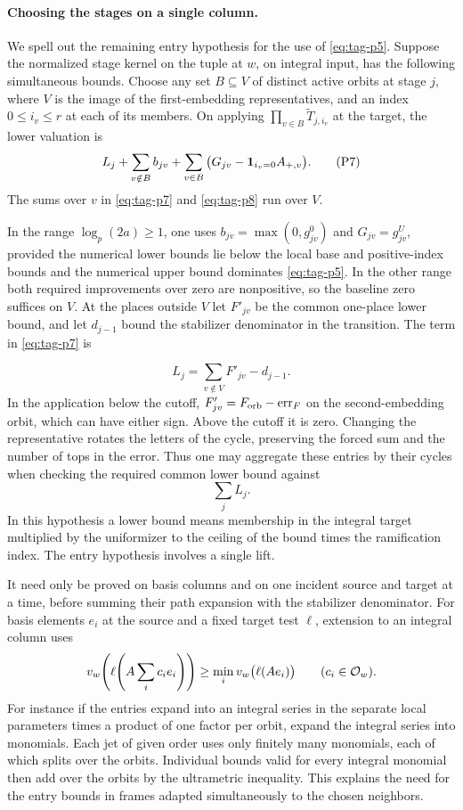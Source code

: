 \paragraph{Choosing the stages on a single column.}
We spell out the remaining entry hypothesis for the use of \eqref{eq:tag-p5}.
Suppose the normalized stage kernel on the tuple at \(w\), on
integral input, has the following simultaneous bounds. Choose any
set \(B\subseteq V\) of distinct active orbits at stage \(j\), where
\(V\) is the image of the first-embedding representatives, and an
index \(0\le i_v\le r\) at each of its members. On applying \(\prod_{v\in B}
\widetilde T_{j,i_v}\) at the target, the lower valuation is
\[
 L_j+\sum_{v\notin B} b_{jv}
    +\sum_{v\in B}\big(G_{jv}-{\bf1}_{i_v=0}A_{+,v}\big).
 \tag{P7}\label{eq:tag-p7}
\]
The sums over \(v\) in \eqref{eq:tag-p7} and \eqref{eq:tag-p8} run over \(V\).

In the
range \(\log_p(2a)\ge1\), one uses
\(b_{jv}=\max(0,g^0_{jv})\) and \(G_{jv}=g^U_{jv}\),
provided the numerical lower bounds lie below the local base
and positive-index bounds and the numerical upper bound dominates
\eqref{eq:tag-p5}. In the other range both required improvements over zero
are nonpositive, so the baseline zero suffices on \(V\).
At the places outside \(V\) let \(F'_{jv}\) be the common
one-place lower bound, and let \(d_{j-1}\) bound the
stabilizer denominator in the transition. The term in \eqref{eq:tag-p7} is

\[
  L_j=\sum_{v\notin V}F'_{jv}-d_{j-1}.
\]
In the application below the cutoff,
\(F'_{jv}=F_{\rm orb}-\mathrm{err}_F\) on the second-embedding
orbit, which can have either sign. Above the cutoff it is zero.
Changing the representative rotates the letters of the cycle,
preserving the forced sum and the number of tops in the error.
Thus one may aggregate these entries by their cycles when
checking the required common lower bound against 
\[
  \sum_j L_j.
\]
 In this hypothesis a lower
bound means membership in the integral target multiplied by the
uniformizer to the ceiling of the bound times the ramification
index. The entry hypothesis involves a single lift.

It need only
be proved on basis columns and on one incident source and target
at a time, before summing their path expansion with the
stabilizer denominator.
For basis elements \(e_i\) at the source and a fixed target test \(\ell\), extension to an integral column uses
\[
  v_w\!\left(\ell\!\left(A\sum_i c_i e_i\right)\right)\ge\min_i v_w\bigl(\ell(Ae_i)\bigr)\qquad(c_i\in{\cal O}_w).
\]
 For instance if the entries expand into
an integral series in the separate local parameters times a
product of one factor per orbit, expand the integral series into
monomials. Each jet of given order uses only finitely many
monomials, each of which splits over the orbits. Individual
bounds valid for every integral monomial then add over the
orbits by the ultrametric inequality. This explains the need
for the entry bounds in frames adapted simultaneously to the
chosen neighbors.

